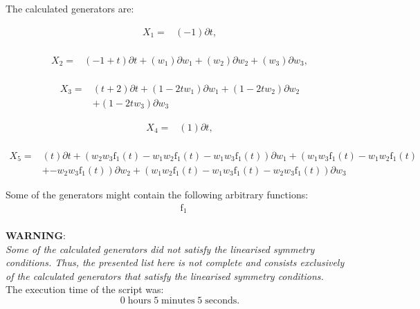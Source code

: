 \noindent The calculated generators are:

\begin{align*}
X_{1}=&\left(-1 \right)\partial t,\\
\end{align*}

\begin{align*}
X_{2}=&\left(-1+t \right)\partial t+\left(w_{1} \right)\partial w_{1}+\left(w_{2} \right)\partial w_{2}+\left(w_{3} \right)\partial w_{3},\\
\end{align*}

\begin{align*}
X_{3}=&\left(t+2 \right)\partial t+\left(1- 2 t w_{1} \right)\partial w_{1}+\left(1- 2 t w_{2} \right)\partial w_{2}\\
&+\left(1- 2 t w_{3} \right)\partial w_{3}
\end{align*}

\begin{align*}
X_{4}=&\left(1 \right)\partial t,\\
\end{align*}

\begin{align*}
X_{5}=&\left(t \right)\partial t+\left(w_{2} w_{3} \operatorname{f_{1}}{\left(t \right)}- w_{1} w_{2} \operatorname{f_{1}}{\left(t \right)}- w_{1} w_{3} \operatorname{f_{1}}{\left(t \right)} \right)\partial w_{1}+\left(w_{1} w_{3} \operatorname{f_{1}}{\left(t \right)}- w_{1} w_{2} \operatorname{f_{1}}{\left(t \right)}\right.\\
&+\left.- w_{2} w_{3} \operatorname{f_{1}}{\left(t \right)} \right)\partial w_{2}+\left(w_{1} w_{2} \operatorname{f_{1}}{\left(t \right)}- w_{1} w_{3} \operatorname{f_{1}}{\left(t \right)}- w_{2} w_{3} \operatorname{f_{1}}{\left(t \right)} \right)\partial w_{3}
\end{align*}



\noindent Some of the generators might contain the following arbitrary functions:
\begin{align*}
&\operatorname{f_{1}}\\
\end{align*}

\noindent\huge\textbf{WARNING}:\\
\noindent\Large\textit{Some of the calculated generators did not satisfy the linearised symmetry conditions. Thus, the presented list here is not complete and consists exclusively of the calculated generators that satisfy the linearised symmetry conditions.}\normalsize\\[2cm]
\noindent The execution time of the script was:
$$0\;\mathrm{hours}\;5\;\mathrm{minutes}\;5 \;\mathrm{seconds}.$$
